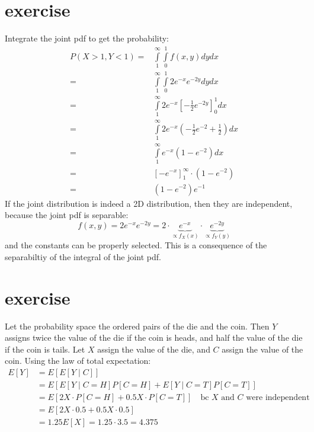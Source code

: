 \documentclass{article}
\begin{document}
\section{exercise}
Integrate the joint pdf to get the probability:
\[
    \begin{aligned}
        P(X>1, Y<1) = & \int\limits_1^\infty  {\int\limits_{ 0 }^1 {f\left( {x,y} \right)dy} dx}          \\
        =             & \int\limits_1^\infty  {\int\limits_{ 0 }^1 2e^{-x}e^{-2y} dy} dx                  \\
        =             & \int\limits_1^\infty  {2e^{-x}\left[ { - \frac{1}{2}e^{-2y}} \right]_0^1} dx      \\
        =             & \int\limits_1^\infty  {2e^{-x}\left( - \frac{1}{2}e^{-2} + \frac{1}{2} \right)dx} \\
        =             & \int\limits_1^\infty  {e^{-x}\left( 1 - e^{-2} \right)dx}                         \\
        =             & \left[ { - e^{-x}} \right]_1^\infty \cdot \left( 1 - e^{-2} \right)               \\
        =             & \left( 1 - e^{-2} \right)e^{-1}
    \end{aligned}
\]
If the joint distribution is indeed a 2D distribution,
then they are independent, because the joint pdf is separable:
\[
    f(x,y) = 2e^{-x}e^{-2y} = 2 \cdot \underbrace {e^{-x}}_{\propto f_X(x)} \cdot \underbrace {e^{-2y}}_{\propto f_Y(y)}
\]
and the constants can be properly selected. This is a consequence of the separabiltiy of the integral of the joint pdf.
\section{exercise}
Let the probability space the ordered pairs of the die and the coin.
Then $Y$ assigns twice the value of the die if the coin is heads,
and half the value of the die if the coin is tails.
Let $X$ assign the value of the die, and $C$ assign the value of the coin.
Using the law of total expectation:
\[
    \begin{aligned}
        E[Y] & = E[E[Y \mid C]]                                                                         \\
             & = E[E[Y \mid C = H]P[C = H] + E[Y \mid C = T]P[C = T]]                                   \\
             & = E[2X \cdot P[C = H] + 0.5X \cdot P[C = T]] \quad\text{bc $X$ and $C$ were independent} \\
             & = E[2X \cdot 0.5 + 0.5X \cdot 0.5]                                                       \\
             & =  1.25E[X] = 1.25 \cdot 3.5 = 4.375
    \end{aligned}
\]
\end{document}
